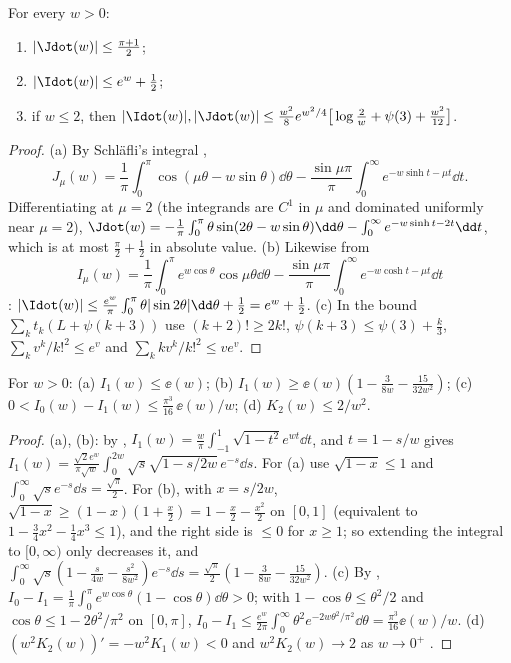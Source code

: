 \begin{lemma}\label{lem:dotbounds}\label{lem:Jdot-uniform}
For every $w>0$:
\begin{enumerate}[label=\textup{(\alph*)}]
\item $|\Jdot(w)|\le\frac{\pi+1}2$;
\item $|\Idot(w)|\le e^w+\frac12$;
\item if $w\le2$, then $|\Idot(w)|,|\Jdot(w)|\le\frac{w^2}8e^{w^2/4}\big[\log\frac2w+\psi(3)+\frac{w^2}{12}\big]$.
\end{enumerate}
\end{lemma}

\begin{proof}
(a) By Schl\"afli's integral \cite[10.9.6]{DLMF},
\[
J_\mu(w)=\frac1\pi\int_0^\pi\cos(\mu\theta-w\sin\theta)\dd\theta-\frac{\sin\mu\pi}\pi\int_0^\infty e^{-w\sinh t-\mu t}\dd t .
\]
Differentiating at $\mu=2$ (the integrands are $C^1$ in $\mu$ and dominated uniformly near $\mu=2$),
$\Jdot(w)=-\frac1\pi\int_0^\pi\theta\sin(2\theta-w\sin\theta)\dd\theta-\int_0^\infty e^{-w\sinh t-2t}\dd t$, which is at most $\frac\pi2+\frac12$ in absolute value.
(b) Likewise from
\[
I_\mu(w)=\frac1\pi\int_0^\pi e^{w\cos\theta}\cos\mu\theta\dd\theta-\frac{\sin\mu\pi}\pi\int_0^\infty e^{-w\cosh t-\mu t}\dd t
\]
\cite[10.32.4]{DLMF}:
$|\Idot(w)|\le\frac{e^w}\pi\int_0^\pi\theta|\sin2\theta|\dd\theta+\frac12=e^w+\frac12$. (c) In the bound
$\sum_kt_k(L+\psi(k+3))$ use $(k+2)!\ge2k!$, $\psi(k+3)\le\psi(3)+\frac k3$, $\sum_kv^k/k!^2\le e^v$ and $\sum_kkv^k/k!^2\le ve^v$.
\end{proof}

\begin{lemma}\label{lem:IK}
For $w>0$:
\textup{(a)} $I_1(w)\le\ee(w)$;
\textup{(b)} $I_1(w)\ge\ee(w)(1-\frac3{8w}-\frac{15}{32w^2})$;
\textup{(c)} $0<I_0(w)-I_1(w)\le\frac{\pi^3}{16}\,\ee(w)/w$;
\textup{(d)} $K_2(w)\le2/w^2$.
\end{lemma}

\begin{proof}
(a), (b): by \cite[10.32.2]{DLMF}, $I_1(w)=\frac w\pi\int_{-1}^1\sqrt{1-t^2}e^{wt}\dd t$, and $t=1-s/w$ gives
$I_1(w)=\frac{\sqrt2e^w}{\pi\sqrt w}\int_0^{2w}\sqrt s\sqrt{1-s/2w}\,e^{-s}\dd s$. For (a) use $\sqrt{1-x}\le1$ and $\int_0^\infty\sqrt se^{-s}\dd s=\frac{\sqrt\pi}2$.
For (b), with $x=s/2w$, $\sqrt{1-x}\ge(1-x)(1+\frac x2)=1-\frac x2-\frac{x^2}2$ on $[0,1]$ (equivalent to $1-\frac34x^2-\frac14x^3\le1$), and
the right side is $\le0$ for $x\ge1$; so extending the integral to $[0,\infty)$ only decreases it, and
$\int_0^\infty\sqrt s(1-\frac s{4w}-\frac{s^2}{8w^2})e^{-s}\dd s=\frac{\sqrt\pi}2(1-\frac3{8w}-\frac{15}{32w^2})$.
(c) By \cite[10.32.3]{DLMF}, $I_0-I_1=\frac1\pi\int_0^\pi e^{w\cos\theta}(1-\cos\theta)\dd\theta>0$; with $1-\cos\theta\le\theta^2/2$ and
$\cos\theta\le1-2\theta^2/\pi^2$ on $[0,\pi]$, $I_0-I_1\le\frac{e^w}{2\pi}\int_0^\infty\theta^2e^{-2w\theta^2/\pi^2}\dd\theta=\frac{\pi^3}{16}\ee(w)/w$.
(d) $(w^2K_2(w))'=-w^2K_1(w)<0$ and $w^2K_2(w)\to2$ as $w\to0^+$ \cite[10.29.4, 10.30.2]{DLMF}.
\end{proof}

